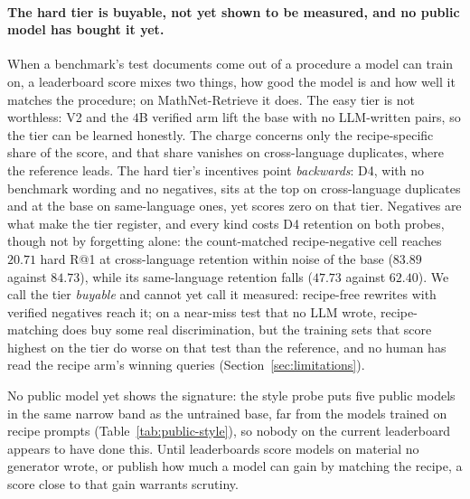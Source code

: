 \paragraph{The hard tier is buyable, not yet shown to be measured, and no public model has bought it yet.}
When a benchmark's test documents come out of a procedure a model can train on, a leaderboard score mixes two things, how good the model is and how well it matches the procedure; on MathNet-Retrieve it does. The easy tier is not worthless: V2 and the $4$B verified arm lift the base with no LLM-written pairs, so the tier can be learned honestly. The charge concerns only the recipe-specific share of the score, and that share vanishes on cross-language duplicates, where the reference leads. The hard tier's incentives point \emph{backwards}: D4, with no benchmark wording and no negatives, sits at the top on cross-language duplicates and at the base on same-language ones, yet scores zero on that tier. Negatives are what make the tier register, and every kind costs D4 retention on both probes, though not by forgetting alone: the count-matched recipe-negative cell reaches $20.71$ hard R@1 at cross-language retention within noise of the base ($83.89$ against $84.73$), while its same-language retention falls ($47.73$ against $62.40$). We call the tier \emph{buyable} and cannot yet call it measured: recipe-free rewrites with verified negatives reach it; on a near-miss test that no LLM wrote, recipe-matching does buy some real discrimination, but the training sets that score highest on the tier do worse on that test than the reference, and no human has read the recipe arm's winning queries (Section~\ref{sec:limitations}).

No public model yet shows the signature: the style probe puts five public models in the same narrow band as the untrained base, far from the models trained on recipe prompts (Table~\ref{tab:public-style}), so nobody on the current leaderboard appears to have done this. Until leaderboards score models on material no generator wrote, or publish how much a model can gain by matching the recipe, a score close to that gain warrants scrutiny.
